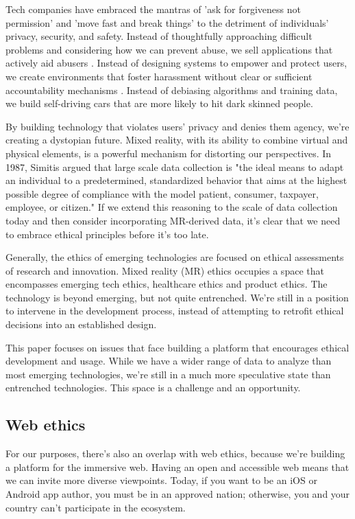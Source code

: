 Tech companies have embraced the mantras of 'ask for forgiveness not permission' and 'move fast and break things' to the detriment of individuals' privacy, security, and safety. Instead of thoughtfully approaching difficult problems and considering how we can prevent abuse, we sell applications that actively aid abusers \cite{dell}. Instead of designing systems to empower and protect users, we create environments that foster harassment without clear or sufficient accountability mechanisms \cite{dreyfuss}. Instead of debiasing algorithms and training data, we build self-driving cars that are more likely to hit dark skinned people\cite{wilson2019predictive}.

By building technology that violates users' privacy and denies them agency, we're creating a dystopian future. Mixed reality, with its ability to combine virtual and physical elements, is a powerful mechanism for distorting our perspectives.  In 1987, Simitis argued that large scale data collection is "the ideal means to adapt an individual to a predetermined, standardized behavior that aims at the highest possible degree of compliance with the model patient, consumer, taxpayer, employee, or citizen." \cite{simitis} If we extend this reasoning to the scale of data collection today and then consider incorporating MR-derived data, it's clear that we need to embrace ethical principles before it's too late.

Generally, the ethics of emerging technologies are focused on ethical assessments of research and innovation. Mixed reality (MR) ethics occupies a space that encompasses emerging tech ethics, healthcare ethics and product ethics. The technology is beyond emerging, but not quite entrenched. We're still in a position to intervene in the development process, instead of attempting to retrofit ethical decisions into an established design. 

This paper focuses on issues that face building a platform that encourages ethical development and usage. While we have a wider range of data to analyze than most emerging technologies, we're still in a much more speculative state than entrenched technologies. This space is a challenge and an opportunity.

\subsection{Web ethics}

For our purposes, there's also an overlap with web ethics, because we're building a platform for the immersive web. Having an open and accessible web means that we can invite more diverse viewpoints. Today, if you want to be an iOS or Android app author, you must be in an approved nation; otherwise, you and your country can't participate in the ecosystem.

